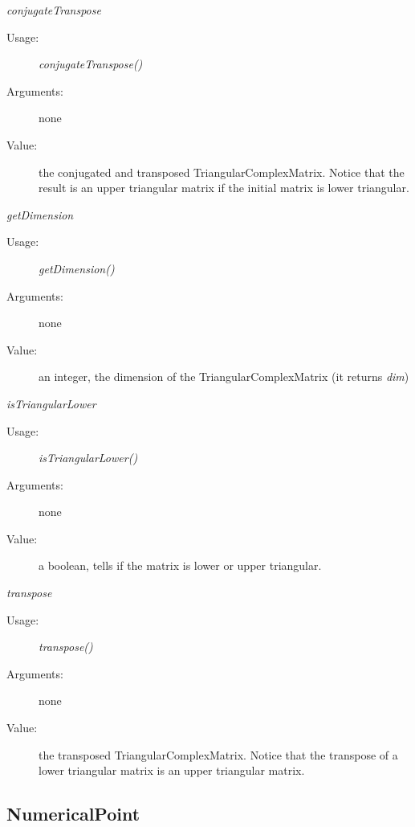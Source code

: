 \begin{description}
\item \textit{conjugateTranspose}
\begin{description}
\item[Usage:] \textit{conjugateTranspose()}
\item[Arguments:] none
\item[Value:] the conjugated and transposed TriangularComplexMatrix. Notice that the result is an upper triangular matrix if the initial matrix is lower triangular.
\end{description}
\bigskip


\item \textit{getDimension}
\begin{description}
\item[Usage:] \textit{getDimension()}
\item[Arguments:] none
\item[Value:] an integer, the dimension of the TriangularComplexMatrix (it returns \textit{dim})
\end{description}
\bigskip

\item \textit{isTriangularLower}
\begin{description}
\item[Usage:] \textit{isTriangularLower()}
\item[Arguments:] none
\item[Value:] a boolean, tells if the matrix is lower or upper triangular.
\end{description}
\bigskip

\item \textit{transpose}
\begin{description}
\item[Usage:] \textit{transpose()}
\item[Arguments:] none
\item[Value:] the transposed TriangularComplexMatrix. Notice that the transpose of a lower triangular matrix is an upper triangular matrix.
\end{description}
\bigskip

\end{description}




\newpage
\subsection{NumericalPoint}

